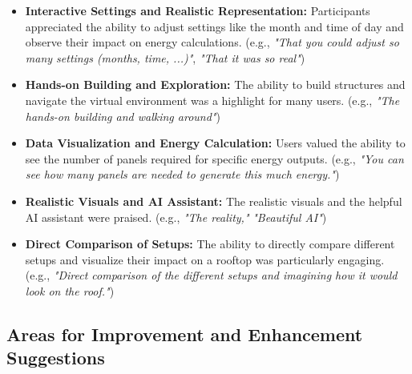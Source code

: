 \documentclass[draft, final]{vutinfth} %
\begin{document}
\begin{itemize}
    \item \textbf{Interactive Settings and Realistic Representation:} Participants appreciated the ability to adjust settings like the month and time of day and observe their impact on energy calculations. (e.g., \textit{"That you could adjust so many settings (months, time, ...)"}, \textit{"That it was so real"})
    \item \textbf{Hands-on Building and Exploration:} The ability to build structures and navigate the virtual environment was a highlight for many users. (e.g., \textit{"The hands-on building and walking around"})
    \item \textbf{Data Visualization and Energy Calculation:} Users valued the ability to see the number of panels required for specific energy outputs. (e.g., \textit{"You can see how many panels are needed to generate this much energy."})
    \item \textbf{Realistic Visuals and AI Assistant:} The realistic visuals and the helpful AI assistant were praised. (e.g., \textit{"The reality,"} \textit{"Beautiful AI"})
    \item \textbf{Direct Comparison of Setups:} The ability to directly compare different setups and visualize their impact on a rooftop was particularly engaging. (e.g., \textit{"Direct comparison of the different setups and imagining how it would look on the roof."})
\end{itemize}

\subsection{Areas for Improvement and Enhancement Suggestions}
\end{document}
